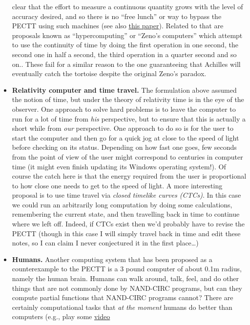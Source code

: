 \begin{itemize}
  clear that the effort to measure a continuous quantity grows with the
  level of accuracy desired, and so there is no ``free lunch'' or way to
  bypass the PECTT using such machines (see also
  \href{http://www.cs.princeton.edu/~ken/MCS86.pdf}{this paper}).
  Related to that are proposals known as ``hypercomputing'' or ``Zeno's
  computers'' which attempt to use the continuity of time by doing the
  first operation in one second, the second one in half a second, the
  third operation in a quarter second and so on.. These fail for a
  similar reason to the one guaranteeing that Achilles will eventually
  catch the tortoise despite the original Zeno's paradox.
\item
  \textbf{Relativity computer and time travel.} The formulation above
  assumed the notion of time, but under the theory of relativity time is
  in the eye of the observer. One approach to solve hard problems is to
  leave the computer to run for a lot of time from \emph{his}
  perspective, but to ensure that this is actually a short while from
  \emph{our} perspective. One approach to do so is for the user to start
  the computer and then go for a quick jog at close to the speed of
  light before checking on its status. Depending on how fast one goes,
  few seconds from the point of view of the user might correspond to
  centuries in computer time (it might even finish updating its Windows
  operating system!). Of course the catch here is that the energy
  required from the user is proportional to how close one needs to get
  to the speed of light. A more interesting proposal is to use time
  travel via \emph{closed timelike curves (CTCs)}. In this case we could
  run an arbitrarily long computation by doing some calculations,
  remembering the current state, and then travelling back in time to
  continue where we left off. Indeed, if CTCs exist then we'd probably
  have to revise the PECTT (though in this case I will simply travel
  back in time and edit these notes, so I can claim I never conjectured
  it in the first place\ldots)
\item
  \textbf{Humans.} Another computing system that has been proposed as a
  counterexample to the PECTT is a 3 pound computer of about 0.1m
  radius, namely the human brain. Humans can walk around, talk, feel,
  and do other things that are not commonly done by NAND-CIRC programs,
  but can they compute partial functions that NAND-CIRC programs cannot?
  There are certainly computational tasks that \emph{at the moment}
  humans do better than computers (e.g., play some
  \href{http://www.theverge.com/2016/11/4/13518210/deepmind-starcraft-ai-google-blizzard}{video
}
\end{itemize}

